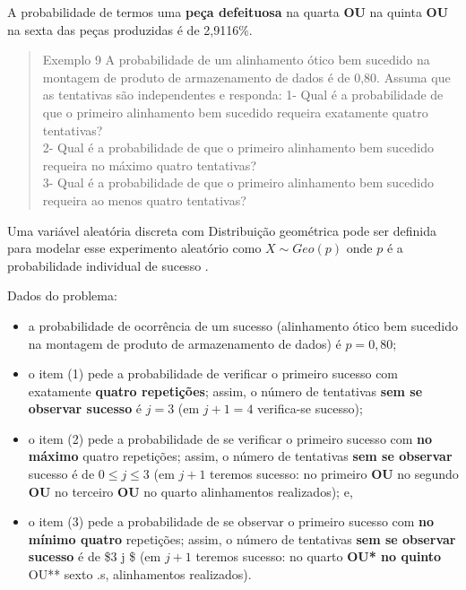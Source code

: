 \documentclass[
]{book}
\providecommand{\tightlist}{%
  \setlength{\itemsep}{0pt}\setlength{\parskip}{0pt}}
\begin{document}
\hfill\break

A probabilidade de termos uma \textbf{peça defeituosa} na quarta \textbf{OU} na quinta \textbf{OU} na sexta das peças produzidas é de 2,9116\%.

\hfill\break

\begin{quote}
Exemplo 9 A probabilidade de um alinhamento ótico bem sucedido na montagem de produto de armazenamento de dados é de 0,80. Assuma que as tentativas são independentes e responda:
1- Qual é a probabilidade de que o primeiro alinhamento bem sucedido requeira exatamente quatro tentativas?\\
2- Qual é a probabilidade de que o primeiro alinhamento bem sucedido requeira no máximo quatro tentativas?\\
3- Qual é a probabilidade de que o primeiro alinhamento bem sucedido requeira ao menos quatro tentativas?
\end{quote}

\hfill\break

Uma variável aleatória discreta com Distribuição geométrica pode ser definida para modelar esse experimento aleatório como \(X\sim Geo(p)\) onde \(p\) é a probabilidade individual de sucesso .

\hfill\break

Dados do problema:

\begin{itemize}
\tightlist
\item
  a probabilidade de ocorrência de um sucesso (alinhamento ótico bem sucedido na montagem de produto de armazenamento de dados) é \(p=0,80\);\\
\item
  o item (1) pede a probabilidade de verificar o primeiro sucesso com exatamente \textbf{quatro repetições}; assim, o número de tentativas \textbf{sem se observar sucesso} é \(j=3\) (em \(j+1=4\) verifica-se sucesso);\\
\item
  o item (2) pede a probabilidade de se verificar o primeiro sucesso com \textbf{no máximo} quatro repetições; assim, o número de tentativas \textbf{sem se observar} sucesso é de \(0 \leq j \leq 3\) (em \(j+1\) teremos sucesso: no primeiro \textbf{OU} no segundo \textbf{OU} no terceiro \textbf{OU} no quarto alinhamentos realizados); e,\\
\item
  o item (3) pede a probabilidade de se observar o primeiro sucesso com \textbf{no mínimo quatro} repetições; assim, o número de tentativas \textbf{sem se observar sucesso} é de \$3 \leq j \leq \infty \$ (em \(j+1\) teremos sucesso: no quarto \textbf{OU* no quinto }OU** sexto .s, alinhamentos realizados).
\end{itemize}
\end{document}

